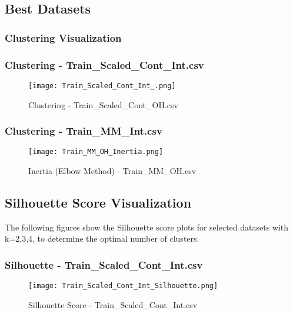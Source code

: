 \documentclass{article}
\begin{document}
\subsection{Best Datasets}
\subsubsection{Clustering Visualization}



\subsubsection{Clustering - Train\_Scaled\_Cont\_Int.csv}

\begin{figure}[H]
    \centering
    \texttt{[image: Train\_Scaled\_Cont\_Int\_.png]}
    \caption{Clustering - Train\_Scaled\_Cont\_OH.csv}
    \label{fig:_scaled_cont_int}
\end{figure}

\subsubsection{Clustering - Train\_MM\_Int.csv}

\begin{figure}[H]
    \centering
    \texttt{[image: Train\_MM\_OH\_Inertia.png]}
    \caption{Inertia (Elbow Method) - Train\_MM\_OH.csv}
    \label{fig:inertia_mm_oh}
\end{figure}



\subsection{Silhouette Score Visualization}

The following figures show the Silhouette score plots for selected datasets with k=2,3,4, to determine the optimal number of clusters.

\subsubsection{Silhouette - Train\_Scaled\_Cont\_Int.csv}

\begin{figure}[H]
    \centering
    \texttt{[image: Train\_Scaled\_Cont\_Int\_Silhouette.png]}
    \caption{Silhouette Score - Train\_Scaled\_Cont\_Int.csv}
    \label{fig:silhouette_scaled_cont_Int}
\end{figure}
\end{document}
